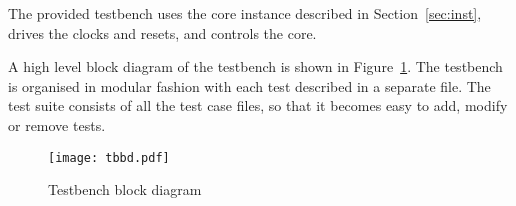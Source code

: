 The provided testbench uses the core instance described in
Section~\ref{sec:inst}, drives the clocks and resets, and controls the core.

A high level block diagram of the testbench is shown in
Figure~\ref{fig:tbbd}. The testbench is organised in modular fashion with each test described in a
separate file. The test suite consists of all the test case files, so that it
becomes easy to add, modify or remove tests.

\begin{figure}[!htbp]
    \centerline{\texttt{[image: tbbd.pdf]}}
    \vspace{0cm}\caption{Testbench block diagram}
    \label{fig:tbbd}
\end{figure}
